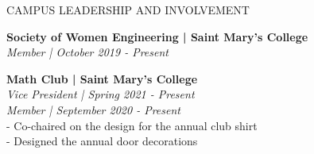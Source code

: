 \documentclass{resume} %
\begin{document}
\begin{rSection}{CAMPUS LEADERSHIP AND INVOLVEMENT}


{\bf Society of Women Engineering | Saint Mary’s College
} \hfill {\em }
\\{\textit{Member | October 2019 - Present}}

{\bf Math Club | Saint Mary’s College} \hfill {\em}
\\{\textit{Vice President | Spring 2021 - Present}}
\\{\textit{Member | September 2020 - Present}}
\\ - Co-chaired on the design for the annual club shirt
\\ - Designed the annual door decorations


%
\end{rSection}





\end{document}
